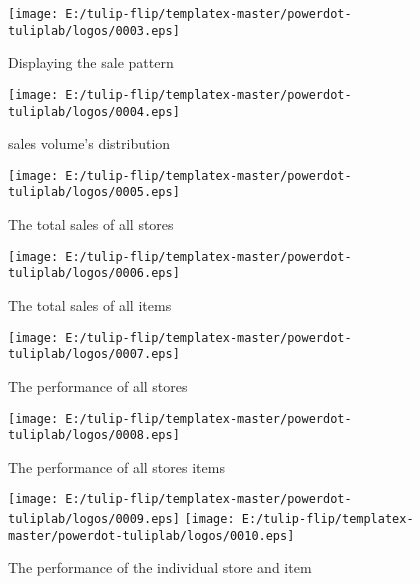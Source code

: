 \begin{figure}[htbp]
	\centering
	
	\texttt{[image: E:/tulip-flip/templatex-master/powerdot-tuliplab/logos/0003.eps]}
	\caption{Displaying the sale pattern}\label{fig:001.eps}
\end{figure}

\begin{figure}[htbp]
	\centering
	
	\texttt{[image: E:/tulip-flip/templatex-master/powerdot-tuliplab/logos/0004.eps]}
	\caption{ sales volume’s distribution}\label{fig:002.eps}
\end{figure}

\begin{figure}[htbp]
	\centering
	
	\texttt{[image: E:/tulip-flip/templatex-master/powerdot-tuliplab/logos/0005.eps]}
	\caption{ The total sales of all stores}\label{fig:003.eps}
\end{figure}

\begin{figure}[htbp]
	\centering
	
	\texttt{[image: E:/tulip-flip/templatex-master/powerdot-tuliplab/logos/0006.eps]}
	\caption{ The total sales of all items}\label{fig:004.eps}
\end{figure}

\begin{figure}[htbp]
	\centering
	
	\texttt{[image: E:/tulip-flip/templatex-master/powerdot-tuliplab/logos/0007.eps]}
	\caption{  The performance of all stores}\label{fig:005.eps}
\end{figure}

\begin{figure}[htbp]
	\centering
	
	\texttt{[image: E:/tulip-flip/templatex-master/powerdot-tuliplab/logos/0008.eps]}
	\caption{ The performance of all stores items}\label{fig:006.eps}
\end{figure}

\begin{figure}[htbp]
	\centering
	
  \texttt{[image: E:/tulip-flip/templatex-master/powerdot-tuliplab/logos/0009.eps]}
  \texttt{[image: E:/tulip-flip/templatex-master/powerdot-tuliplab/logos/0010.eps]}
	\caption{  The performance of the individual store and item}\label{fig:007.eps}
\end{figure}

